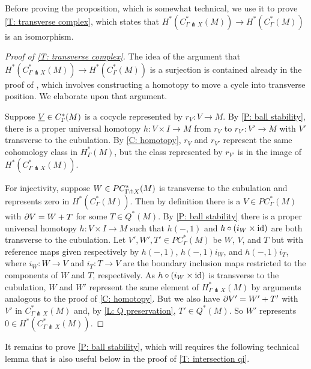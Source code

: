 Before proving the proposition, which is somewhat technical, we use it to prove \cref{T: transverse complex}, which states that $H^*(C^*_{\Gamma \pitchfork X}(M)) \to H^*(C_\Gamma^*(M))$ is an isomorphism.



\begin{proof}[Proof of \cref{T: transverse complex}]
	The idea of the argument that $H^*(C^*_{\Gamma \pitchfork X}(M)) \to H^*(C_\Gamma^*(M))$ is a surjection is contained already in the proof of \cite[Lemma 15]{Lipy14}, which involves constructing a homotopy to move a cycle into transverse position.
	We elaborate upon that argument.

Suppose $\underline{V}\in C_\Gamma^*(M)$ is a cocycle represented by $r_V:V\to M$. By \cref{P: ball stability}, there is a proper universal homotopy $h: V\times I\to M$ from $r_V$ to $r_{V'}:V'\to M$ with $V'$ transverse to the cubulation.
By \cref{C: homotopy}, $r_V$ and $r_{V'}$ represent the same cohomology class in $H^*_{\Gamma}(M)$, but the class represented by $r_{V'}$ is in the image of $H^*(C^*_{\Gamma \pitchfork X}(M))$.


For injectivity, suppose  $W\in PC^*_{\Gamma\pitchfork X}(M)$ is transverse to the cubulation and represents zero in $H^*(C_\Gamma^*(M))$. Then by definition there is a $V\in PC^*_\Gamma(M)$ with $\partial V=W+T$ for some
	$T \in Q^*(M)$.
By \cref{P: ball stability} there is a proper universal homotopy $h:V\times I\to M$ such that $h(-,1)$  and $h\circ(i_{W}\times \mathrm{id})$ are both transverse to the cubulation.
Let $V', W',T'\in PC^*_\Gamma(M)$ be $W$, $V$, and $T$ but with reference maps given respectively by $h(-,1)$, $h(-,1)i_W$, and $h(-,1)i_T$, where $i_W:W\to V$ and $i_T:T\to V$ are the boundary inclusion maps restricted to the components of $W$ and $T$, respectively.
As $h\circ(i_{W}\times \mathrm{id})$ is transverse to the cubulation,  $W$ and $W'$ represent the same element of $H^*_{\Gamma \pitchfork X}(M)$ by arguments analogous to the proof of \cref{C: homotopy}.
But we also have $\partial V'=W'+T'$ with $V'$ in $C^*_{\Gamma \pitchfork X}(M)$ and, by \cref{L: Q preservation},   $T'\in Q^*(M)$. So $W'$ represents $0\in H^*(C^*_{\Gamma \pitchfork X}(M))$.
\end{proof}

It remains to prove \cref{P: ball stability}, which will requires the following technical lemma that is also useful below in the proof of \cref{T: intersection qi}.

